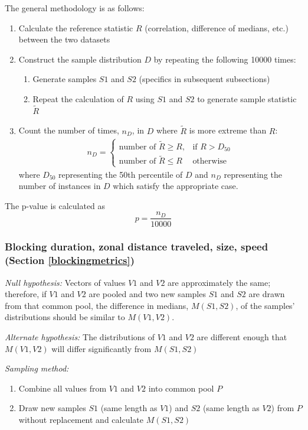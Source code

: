 \documentclass[smallextended]{svjour3}       %
\numberwithin{equation}{section}
\begin{document}
\begin{appendices}
The general methodology is as follows:
\begin{enumerate}
    \item Calculate the reference statistic $R$ (correlation, difference of medians, etc.) between the two datasets
    \item Construct the sample distribution $D$ by repeating the following 10000 times:
    \begin{enumerate}
        \item Generate samples $S1$ and $S2$ (specifics in subsequent subsections)
        \item Repeat the calculation of $R$ using $S1$ and $S2$ to generate sample statistic $\widetilde{R}$
    \end{enumerate}
    \item Count the number of times, $n_D$, in $D$ where $\widetilde{R}$ is more extreme than $R$: \begin{eqnarray}
n_D =  
\begin{cases}
    \text{number of } \widetilde{R}\geq R,& \text{if } R>D_{50}\\
     \text{number of }\widetilde{R}\leq R             & \text{otherwise}
\end{cases}
\end{eqnarray}
where $D_{50}$ representing the 50th percentile of $D$ and $n_D$ representing the number of instances in $D$ which satisfy the appropriate case. 
\end{enumerate}

The p-value is calculated as \begin{equation}
    p=\frac{n_D}{10000}
\end{equation}

\subsubsection{Blocking duration, zonal distance traveled, size, speed (Section \ref{blockingmetrics})}
\textit{Null hypothesis:} Vectors of values $V1$ and $V2$ are approximately the same; therefore, if $V1$ and $V2$ are pooled and two new samples $S1$ and $S2$ are drawn from that common pool, the difference in medians, $M(S1,S2)$, of the samples' distributions should be similar to $M(V1,V2)$.

\noindent\textit{Alternate hypothesis:} The distributions of $V1$ and $V2$ are different enough that $M(V1,V2)$ will differ significantly from $M(S1,S2)$

\noindent\textit{Sampling method:}
\begin{enumerate}
     \item Combine all values from $V1$ and $V2$ into common pool $P$
    \item Draw new samples $S1$ (same length as $V1$) and $S2$ (same length as $V2$) from $P$ without replacement and calculate $M(S1,S2)$
\end{enumerate}



\end{appendices}
\end{document}
